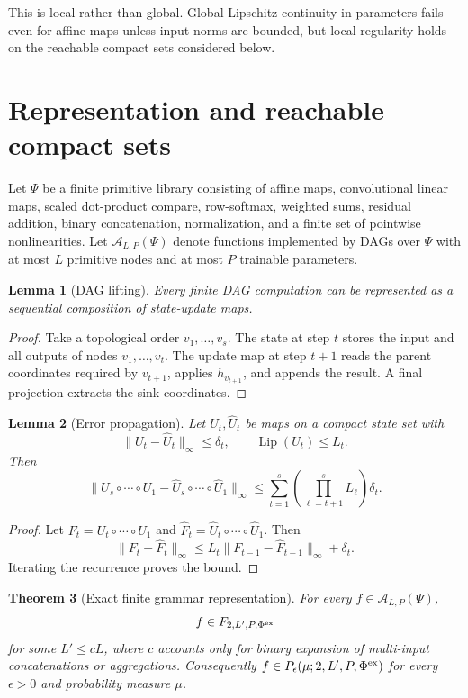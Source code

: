 \documentclass[11pt]{article}
\newtheorem{theorem}{Theorem}[section]
\newtheorem{lemma}[theorem]{Lemma}
\theoremstyle{definition}
\newcommand{\Lip}{\operatorname{Lip}}
\begin{document}
This is local rather than global. Global Lipschitz continuity in parameters fails even for affine maps unless input norms are bounded, but local regularity holds on the reachable compact sets considered below.

\section{Representation and reachable compact sets}

Let \(\Psi\) be a finite primitive library consisting of affine maps, convolutional linear maps, scaled dot-product compare, row-softmax, weighted sums, residual addition, binary concatenation, normalization, and a finite set of pointwise nonlinearities. Let \(\mathcal A_{L,P}(\Psi)\) denote functions implemented by DAGs over \(\Psi\) with at most \(L\) primitive nodes and at most \(P\) trainable parameters.

\begin{lemma}[DAG lifting]
Every finite DAG computation can be represented as a sequential composition of state-update maps.
\end{lemma}

\begin{proof}
Take a topological order \(v_1,\ldots,v_s\). The state at step \(t\) stores the input and all outputs of nodes \(v_1,\ldots,v_t\). The update map at step \(t+1\) reads the parent coordinates required by \(v_{t+1}\), applies \(h_{v_{t+1}}\), and appends the result. A final projection extracts the sink coordinates.
\end{proof}

\begin{lemma}[Error propagation]
Let \(U_t,\widehat U_t\) be maps on a compact state set with
\[
  \|U_t-\widehat U_t\|_\infty\le \delta_t,\qquad \Lip(U_t)\le L_t.
\]
Then
\[
\|U_s\circ\cdots\circ U_1-\widehat U_s\circ\cdots\circ\widehat U_1\|_\infty
\le \sum_{t=1}^s\left(\prod_{\ell=t+1}^s L_\ell\right)\delta_t.
\]
\end{lemma}

\begin{proof}
Let \(F_t=U_t\circ\cdots\circ U_1\) and \(\widehat F_t=\widehat U_t\circ\cdots\circ\widehat U_1\). Then
\[
\|F_t-\widehat F_t\|_\infty
\le L_t\|F_{t-1}-\widehat F_{t-1}\|_\infty+\delta_t.
\]
Iterating the recurrence proves the bound.
\end{proof}

\begin{theorem}[Exact finite grammar representation]
For every \(f\in\mathcal A_{L,P}(\Psi)\),
\[
  f\in F_{2,L',P,\Phi^{\rm ex}}
\]
for some \(L'\le cL\), where \(c\) accounts only for binary expansion of multi-input concatenations or aggregations. Consequently \(f\in P_\epsilon(\mu;2,L',P,\Phi^{\rm ex})\) for every \(\epsilon>0\) and probability measure \(\mu\).
\end{theorem}
\end{document}
